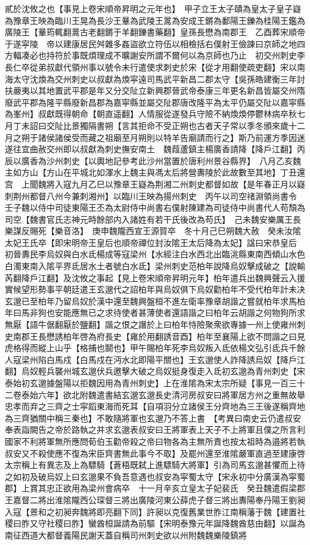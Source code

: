 貳於沈攸之也【事見上卷宋順帝昇明之元年也】　甲子立王太子賾為皇太子皇子嶷為豫章王映為臨川王晃為長沙王曅為武陵王暠為安成王鏘為鄱陽王鑠為桂陽王鑑為廣陵王【曅筠輒翻暠古老翻鏘于羊翻鑠書藥翻】皇孫長懋為南郡王　乙酉葬宋順帝于遂寜陵　帝以建康居民舛雜多姦盜欲立符伍以相檢括右僕射王儉諫曰京師之地四方輻凑必也持符於事既煩理成不曠謝安所謂不爾何以為京師也乃止　初交州刺史李長仁卒從弟叔獻代領州事以號令未行遣使求刺史於宋【從才用翻使疏吏翻】宋以南海太守沈煥為交州刺史以叔獻為煥寜遠司馬武平新昌二郡太守【吳孫皓建衡三年討扶嚴夷以其地置武平郡是年又分交阯立新興郡晉武帝泰康三年更名新昌皆屬交州隋廢武平郡為隆平縣廢新昌郡為嘉寜縣並屬交阯郡唐改隆平為太平仍屬交阯以嘉寜縣為峯州】叔獻既得朝命【朝直遥翻】人情服從遂發兵守險不納煥煥停鬱林病卒秋七月丁未詔曰交阯比景獨隔書朔【言其拒命不受正朔也古者天子常以季冬頒來歲十二月之朔于諸侯諸侯受而藏之祖廟至月朔則以特羊告廟請而行之】斯乃前運方季因迷遂往宜曲赦交州即以叔獻為刺史撫安南土　魏葭蘆鎮主楊廣香請降【降戶江翻】丙辰以廣香為沙州刺史【以輿地記參考此沙州當置於唐利州景谷縣界】　八月乙亥魏主如方山【方山在平城北如渾水上魏主與馮太后將營夀陵於此故數至其地】丁丑還宫　上聞魏將入寇九月乙巳以豫章王嶷為荆湘二州刺史都督如故【是年春正月以嶷刺荆州都督八州今兼刺湘州】以臨川王映為揚州刺史　丙午以司空禇淵領尚書令　壬子魏以侍中司徒東陽王丕為太尉侍中尚書右僕射陳建為司徒侍中尚書代人苟頹為司空【魏書官氏志神元時餘部内入諸姓有若干氏後改為苟氏】　己未魏安樂厲王長樂謀反賜死【樂音洛】　庚申魏隴西宣王源賀卒　冬十月己巳朔魏大赦　癸未汝隂太妃王氏卒【即宋明帝王皇后也順帝禪位封汝隂王太后降為太妃】諡曰宋恭皇后　初晉夀民李烏奴與白水氐楊成等寇梁州【水經注白水西北出臨洮縣東南西傾山水色白濁東南入隂平界氐居水土者號白水氐】梁州刺史范柏年說降烏奴擊成破之【說輸芮翻降戶江翻】及沈攸之事起【見上卷宋順帝昇明元年】柏年遣兵出魏興聲云入援實候望形勢事平朝廷遣王玄邈代之詔柏年與烏奴俱下烏奴勸柏年不受代柏年計未决玄邈已至柏年乃留烏奴於漢中還至魏興盤桓不進左衛率豫章胡諧之嘗就柏年求馬柏年曰馬非狗也安能應無已之求待使者甚薄使者還語諧之曰柏年云胡諧之何物狗所求無厭【語牛倨翻厭於鹽翻】諧之恨之譖於上曰柏年恃險聚衆欲專據一州上使雍州刺史南郡王長懋誘柏年啓為府長史【雍於用翻誘音酉】柏年至襄陽上欲不問諧之曰見虎格得而縱上山乎【格捕也鬬也】甲午賜柏年死李烏奴叛入氐依楊文弘引氐兵千餘人寇梁州陷白馬戍【白馬戍在沔水北即陽平關也】王玄邈使人詐降誘烏奴【降戶江翻】烏奴輕兵襲州城玄邈伏兵邀擊大破之烏奴挺身復走入氐初玄邈為青州刺史【宋泰始初玄邈據盤陽以拒魏因用為青州刺史】上在淮隂為宋太宗所疑【事見一百三十二卷泰始六年】欲北附魏遣書結玄邈玄邈長史清河房叔安曰將軍居方州之重無故舉忠孝而弃之三齊之士寜蹈東海而死耳【自項羽分立諸侯王分齊地為三王後遂稱齊地為三齊猶關中稱三秦也】不敢隨將軍也玄邈乃不答上書　【考異曰南史云仍遣叔安奉表詣闕告之帝於路執之并求玄邈表叔安曰王將軍表上天子不上將軍且僕之所言利國家不利將軍無所應問荀伯玉勸帝殺之帝曰物各為主無所責也按太祖時為邉將若執叔安又不殺使應不復為宋臣齊書無此事今不取】及罷州還至淮隂嚴軍直過至建康啓太宗稱上有異志及上為驃騎【蒼梧既弑上進驃騎大將軍】引為司馬玄邈甚懼而上待之如初及破烏奴上曰玄邈果不負吾意遇也叔安為寜蜀太守【宋永初中分廣漢為寜蜀郡】上賞其忠正欲用為梁州會病卒　十一月辛亥立皇太子妃裴氏　癸丑魏遣假梁郡王嘉督二將出淮隂隴西公琛督三將出廣陵河東公薛虎子督三將出夀陽奉丹陽王劉昶入寇【景和之初昶奔魏將即亮翻下同】許昶以克復舊業世胙江南稱藩于魏【建置社稷曰胙又守社稷曰胙】蠻酋桓誕請為前驅【宋明泰豫元年誕降魏酋慈由翻】以誕為南征西道大都督義陽民謝天蓋自稱司州刺史欲以州附魏魏樂陵鎮將
